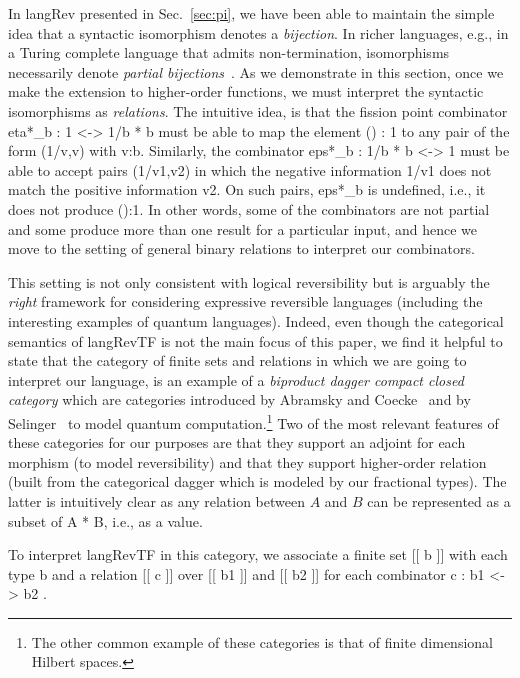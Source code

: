 \documentclass{llncs}
\begin{document}
In {{langRev}} presented in Sec.~\ref{sec:pi}, we have been able to maintain
the simple idea that a syntactic isomorphism denotes a \emph{bijection}. In
richer languages, e.g., in a Turing complete language that admits
non-termination, isomorphisms necessarily denote \emph{partial
  bijections}~\cite{rc2011,infeffects}. As we demonstrate in this section,
once we make the extension to higher-order functions, we must interpret the
syntactic isomorphisms as \emph{relations}. The intuitive idea, is that the
fission point combinator {{eta*_b : 1 <-> 1/b * b}} must be able to map the
element {{() : 1}} to any pair of the form {{(1/v,v)}} with
{{v:b}}. Similarly, the combinator {{eps*_b : 1/b * b <-> 1}} must be able to
accept pairs {{(1/v1,v2)}} in which the negative information {{1/v1}} does
not match the positive information {{v2}}. On such pairs, {{eps*_b}} is
undefined, i.e., it does not produce {{():1}}. In other words, some of the
combinators are not partial and some produce more than one result for a
particular input, and hence we move to the setting of general binary
relations to interpret our combinators. 

This setting is not only consistent with logical reversibility but is
arguably the \emph{right} framework for considering expressive reversible
languages (including the interesting examples of quantum languages).  Indeed,
even though the categorical semantics of {{langRevTF}} is not the main focus
of this paper, we find it helpful to state that the category of finite sets
and relations in which we are going to interpret our language, is an example
of a \emph{biproduct dagger compact closed category} which are categories
introduced by Abramsky and Coecke~\cite{Abramsky:2004:CSQ:1018438.1021878}
and by Selinger~\cite{Selinger:2007:DCC:1229185.1229207} to model quantum
computation.\footnote{The other common example of these categories is that of
  finite dimensional Hilbert spaces.} Two of the most relevant features of
these categories for our purposes are that they support an adjoint for each
morphism (to model reversibility) and that they support higher-order relation
(built from the categorical dagger which is modeled by our fractional
types). The latter is intuitively clear as any relation between $A$ and $B$
can be represented as a subset of {{A * B}}, i.e., as a value.

To interpret {{langRevTF}} in this category, we associate a finite set
{{ [[ b ]] }} with each type {{b}} and a relation {{ [[ c ]] }} over
{{ [[ b1 ]] }} and {{ [[ b2 ]] }} for each combinator {{ c : b1 <-> b2 }}.
\end{document}
